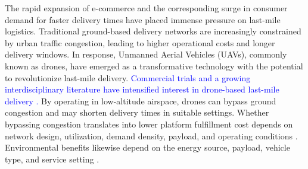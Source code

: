 \documentclass[final,3p,authoryear]{elsarticle}
\begin{document}
The rapid expansion of e-commerce and the corresponding surge in consumer demand for faster delivery times have placed immense pressure on last-mile logistics.
Traditional ground-based delivery networks are increasingly constrained by urban traffic congestion, leading to higher operational costs and longer delivery windows.
In response, Unmanned Aerial Vehicles (UAVs), commonly known as drones, have emerged as a transformative technology with the potential to revolutionize last-mile delivery.
\textcolor{blue}{Commercial trials and a growing interdisciplinary literature have intensified interest in drone-based last-mile delivery \citep{DroneEconomicViabilityReview2025}.}
\color{blue}
By operating in low-altitude airspace, drones can bypass ground congestion and may shorten delivery times in suitable settings.
Whether bypassing congestion translates into lower platform fulfillment cost depends on network design, utilization, demand density, payload, and operating conditions \citep{DroneEconomicViabilityReview2025}.
Environmental benefits likewise depend on the energy source, payload, vehicle type, and service setting \citep{GoodchildToy2018DroneEmissions,Stolaroff2018DroneEnergy}.
\color{black}

\end{document}
